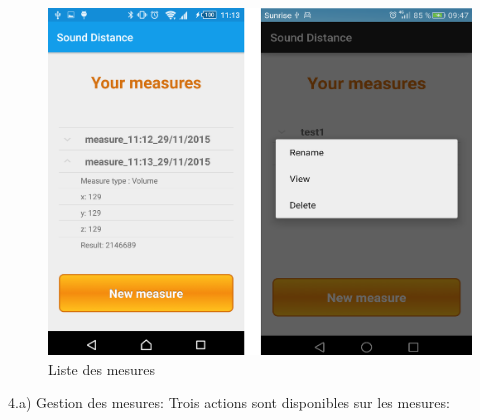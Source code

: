 \begin{figure}[H]
	\begin{center}
		\includegraphics[width=12cm]{img/mesureList.png}
		\caption{Liste des mesures}
		\label{mesureList}
	\end{center}
\end{figure}
4.a) Gestion des mesures: Trois actions sont disponibles sur les mesures:
